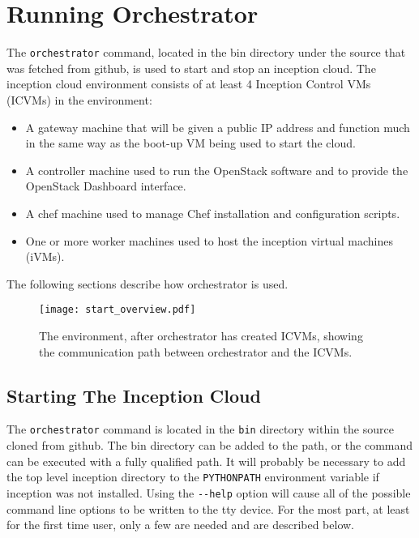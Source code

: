 \section{Running Orchestrator}
The \verb!orchestrator! command, located in the bin directory under the source that was fetched from github,
is used to start and stop an inception cloud.
The inception cloud environment consists of at least 4 Inception Control VMs (ICVMs)  in the environment:

\begin{itemize}
\item A gateway machine that will be given a public IP address and function much in the same way as the
boot-up VM being used to start the cloud.

\item A controller machine used to run the OpenStack software and to provide the OpenStack Dashboard interface.

\item A chef machine used to manage Chef installation and configuration scripts.

\item One or more worker machines used to host the inception virtual machines (iVMs).
\end{itemize}

\noindent
The following sections describe how orchestrator is used.

\begin{figure}
  \centering
  \texttt{[image: start\_overview.pdf]}
  \tiny
  \caption{\small The environment, after orchestrator has created ICVMs, showing the communication path between orchestrator and the ICVMs.
    \label{fg_overview} \normalsize
  }
  \normalsize
\end{figure}

\subsection{Starting The Inception Cloud}
The \verb!orchestrator! command is located in the \verb!bin! directory within the source cloned from github.
The bin directory can be added to the path, or the command can be executed with a fully qualified path.
It will probably be necessary to add the top level inception directory to the \verb!PYTHONPATH! environment variable
if inception was not installed.
Using the \verb!--help! option will cause all of the possible command line options to be written to the tty device.
For the most part, at least for the first time user, only a few are needed and are described
below. %

